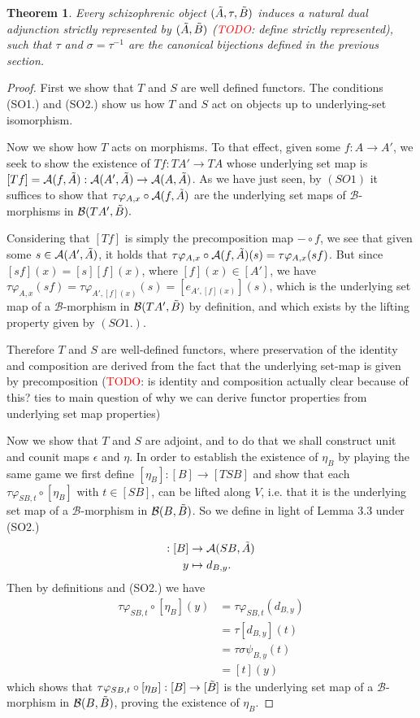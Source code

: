 \documentclass[12pt,a4paper]{article}
\newtheorem{theorem}{Theorem}[section] %
\def\HomA{\ensuremath\mathcal{A}}
\def\HomB{\ensuremath\mathcal{B}}
\def\t{\ensuremath\tilde}
\begin{document}
\begin{theorem}
	Every schizophrenic object $(\t A, \tau , \t B)$ induces a natural dual adjunction strictly represented by $(\t A, \t B)$ (\textcolor{red}{TODO}: define strictly represented), such that $\tau$ and $\sigma = \tau^{-1}$ are the canonical bijections defined in the previous section.
\end{theorem}
\begin{proof}
	First we show that $T$ and $S$ are well defined functors. The conditions (SO1.) and (SO2.) show us how $T$ and $S$ act on objects up to underlying-set isomorphism. 
	
	Now we show how $T$ acts on morphisms. To that effect, given some $f: A \to A'$, we seek to show the existence of $Tf: TA' \to TA$ whose underlying set map is $[Tf] = \HomA(f, \t A): \HomA(A', \t A) \to \HomA(A, \t A)$. As we have just seen, by $(SO1)$ it suffices to show that $\tau \varphi_{A,x}\circ \HomA(f, \t A)$ are the underlying set maps of  $\mathcal{B}$-morphisms in $\HomB(TA', \t B).$
	
	Considering that $[Tf]$ is simply the precomposition map $- \circ f$, we see that given some $s \in \HomA(A', \t A)$, it holds that $\tau \varphi_{A,x}\circ \HomA(f, \t A)(s) =\tau \varphi_{A,x}(sf)$. But since $[sf](x) = [s][f](x)$, where $[f](x) \in [A']$, we have $\tau \varphi_{A,x}(sf) = \tau \varphi_{A',[f](x)}(s) = [e_{A',[f](x)}](s)$, which is the underlying set map of a $\mathcal{B}$-morphism in $\HomB(TA', \t B)$ by definition, and which exists by the lifting property given by $(SO1.)$. 
	
	Therefore $T$ and $S$ are well-defined functors, where preservation of the identity and composition are derived from the fact that the underlying set-map is given by precomposition (\textcolor{red}{TODO}:  is identity and composition actually clear because of this? ties to main question of why we can derive functor properties from underlying set map properties)
	
	Now we show that $T$ and $S$ are adjoint, and to do that we shall construct  unit and counit maps $\epsilon$ and $\eta$. In order to establish the existence of $\eta_B$ by playing the same game we first define $[\eta_B]: [B] \to [TSB]$ and show that each $\tau \varphi_{SB, t} \circ [\eta_B]$ with $t \in [SB]$, can be lifted along $V$, i.e. that it is the underlying set map of a $\mathcal{B}$-morphism in $\HomB(B, \t B)$. So we define in light of Lemma 3.3 under (SO2.)
	\begin{align*}
		[\eta_B]:[B] &\to \HomA(SB, \t A)\\
		y &\mapsto d_{B,y}.
	\end{align*}
Then by definitions and (SO2.) we have  \begin{align*}
	\tau \varphi_{SB, t} \circ [\eta_B](y) &= \tau \varphi_{SB, t} (d_{B,y})\\ &= \tau [d_{B,y}](t)\\ &= \tau \sigma \psi_{B,y}(t)\\ &= [t](y)
\end{align*}
which shows that $\tau \varphi_{SB, t} \circ [\eta_B]: [B] \to [\t B]$ is the underlying set map of a $\mathcal{B}$-morphism in $\HomB(B, \t B)$, proving the existence of $\eta_B$. 


\end{proof}
\end{document}
